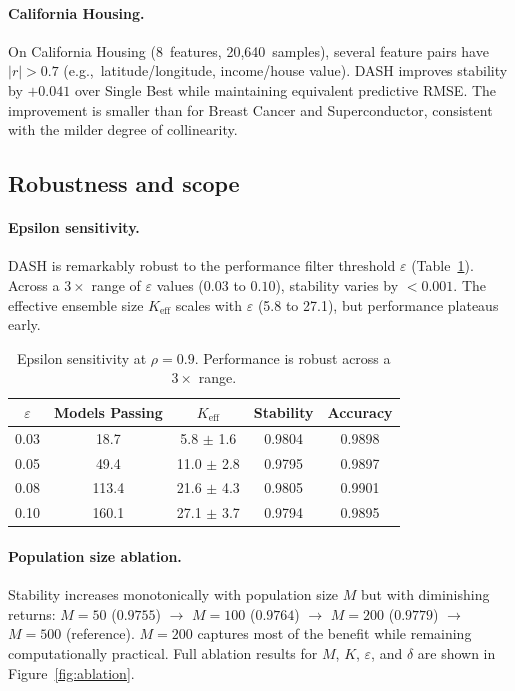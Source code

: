 \documentclass[11pt]{article}
\newcommand{\dash}{\textsc{DASH}}
\newcommand{\rhovar}{\rho}
\newcommand{\eg}{e.g.,\ }
\begin{document}
\paragraph{California Housing.}
On California Housing (8~features, 20,640~samples), several feature
pairs have $|r| > 0.7$ (\eg latitude/longitude, income/house value).
\dash{} improves stability by $+0.041$ over Single Best while
maintaining equivalent predictive RMSE. The improvement is smaller than
for Breast Cancer and Superconductor, consistent with the milder degree
of collinearity.

\subsection{Robustness and scope}
\label{sec:robustness}

\paragraph{Epsilon sensitivity.}
\dash{} is remarkably robust to the performance filter threshold
$\varepsilon$ (Table~\ref{tab:epsilon}). Across a $3\times$ range of
$\varepsilon$ values ($0.03$ to $0.10$), stability varies by $< 0.001$.
The effective ensemble size $K_{\text{eff}}$ scales with $\varepsilon$
(5.8 to 27.1), but performance plateaus early.

\begin{table}[h]
\centering
\caption{Epsilon sensitivity at $\rhovar = 0.9$. Performance is robust
across a $3\times$ range.}
\label{tab:epsilon}
\begin{tabular}{ccccc}
\toprule
$\varepsilon$ & Models Passing & $K_{\text{eff}}$ & Stability & Accuracy \\
\midrule
0.03 & 18.7  & 5.8 $\pm$ 1.6  & 0.9804 & 0.9898 \\
0.05 & 49.4  & 11.0 $\pm$ 2.8 & 0.9795 & 0.9897 \\
0.08 & 113.4 & 21.6 $\pm$ 4.3 & 0.9805 & 0.9901 \\
0.10 & 160.1 & 27.1 $\pm$ 3.7 & 0.9794 & 0.9895 \\
\bottomrule
\end{tabular}
\end{table}

\paragraph{Population size ablation.}
Stability increases monotonically with population size $M$ but with
diminishing returns: $M = 50$ ($0.9755$) $\to$ $M = 100$ ($0.9764$)
$\to$ $M = 200$ ($0.9779$) $\to$ $M = 500$ (reference). $M = 200$
captures most of the benefit while remaining computationally practical.
Full ablation results for $M$, $K$, $\varepsilon$, and $\delta$ are
shown in Figure~\ref{fig:ablation}.
\end{document}
